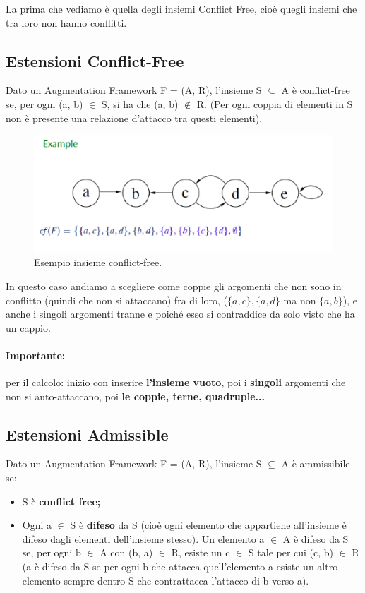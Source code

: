 La prima che vediamo è quella degli insiemi Conflict Free, cioè
quegli insiemi che tra loro non hanno conflitti.

\subsection{Estensioni Conflict-Free}
Dato un Augmentation Framework F = (A, R), l'insieme S $\subseteq$ A è
conflict-free se, per ogni (a, b) $\in$ S, si ha che (a, b) $\notin$ R. (Per
ogni coppia di elementi in S non è presente una relazione d'attacco tra questi
elementi).

\begin{figure}[H]
    \centering
    \includegraphics[width=12cm, keepaspectratio]{img/Cap6/cf.png}
    \caption{Esempio insieme conflict-free.}
\end{figure}

In questo caso andiamo a scegliere come coppie gli argomenti che non sono in
conflitto (quindi che non si attaccano) fra di loro, ($\{a,c\},\{a,d\}$ ma non $\{a,b\}$),
e anche i singoli argomenti tranne e poiché esso si contraddice da solo visto
che ha un cappio.

\paragraph{Importante:} per il calcolo: inizio con inserire
\textbf{l'insieme vuoto}, poi i \textbf{singoli} argomenti che non si
auto-attaccano, poi \textbf{le coppie, terne, quadruple...}

\subsection{Estensioni Admissible}
Dato un Augmentation Framework F = (A, R), l'insieme S $\subseteq$ A è
ammissibile se:
\begin{itemize}
    \item S è \textbf{conflict free;}
    \item Ogni a $\in$ S è \textbf{difeso} da S (cioè ogni elemento che
          appartiene all'insieme è difeso dagli elementi dell'insieme stesso). Un
          elemento a $\in$ A è difeso da S se, per ogni b $\in$ A con (b, a) $\in$ R,
          esiste un c $\in$ S tale per cui (c, b) $\in$ R (a è difeso da S se per ogni
          b che attacca quell'elemento a esiste un altro elemento sempre dentro S che
          contrattacca l'attacco di b verso a).
\end{itemize}

